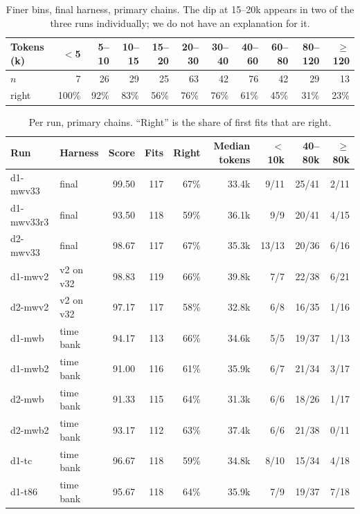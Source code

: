 \begin{table}[H]\centering\small
\begin{tabular}{@{}lrrrrrrrrrr@{}}
\toprule
Tokens (k) & $<$5 & 5--10 & 10--15 & 15--20 & 20--30 & 30--40 & 40--60 & 60--80 & 80--120 & $\geq$120 \\
\midrule
$n$ & 7 & 26 & 29 & 25 & 63 & 42 & 76 & 42 & 29 & 13 \\
right & 100\% & 92\% & 83\% & 56\% & 76\% & 76\% & 61\% & 45\% & 31\% & 23\% \\
\bottomrule
\end{tabular}
\caption{Finer bins, final harness, primary chains. The dip at 15--20k appears in two of the three runs individually; we do not have an explanation for it.}
\end{table}

\begin{table}[H]\centering\small
\begin{tabular}{@{}llrrrrrrr@{}}
\toprule
Run & Harness & Score & Fits & Right & Median tokens & $<$10k & 40--80k & $\geq$80k \\
\midrule
d1-mwv33 & final & 99.50 & 117 & 67\% & 33.4k & 9/11 & 25/41 & 2/11 \\
d1-mwv33r3 & final & 93.50 & 118 & 59\% & 36.1k & 9/9 & 20/41 & 4/15 \\
d2-mwv33 & final & 98.67 & 117 & 67\% & 35.3k & 13/13 & 20/36 & 6/16 \\
d1-mwv2 & v2 on v32 & 98.83 & 119 & 66\% & 39.8k & 7/7 & 22/38 & 6/21 \\
d2-mwv2 & v2 on v32 & 97.17 & 117 & 58\% & 32.8k & 6/8 & 16/35 & 1/16 \\
d1-mwb & time bank & 94.17 & 113 & 66\% & 34.6k & 5/5 & 19/37 & 1/13 \\
d1-mwb2 & time bank & 91.00 & 116 & 61\% & 35.9k & 6/7 & 21/34 & 3/17 \\
d2-mwb & time bank & 91.33 & 115 & 64\% & 31.3k & 6/6 & 18/26 & 1/17 \\
d2-mwb2 & time bank & 93.17 & 112 & 63\% & 37.4k & 6/6 & 21/38 & 0/11 \\
d1-tc & time bank & 96.67 & 118 & 59\% & 34.8k & 8/10 & 15/34 & 4/18 \\
d1-t86 & time bank & 95.67 & 118 & 64\% & 35.9k & 7/9 & 19/37 & 7/18 \\
\bottomrule
\end{tabular}
\caption{Per run, primary chains. ``Right'' is the share of first fits that are right.}
\end{table}


